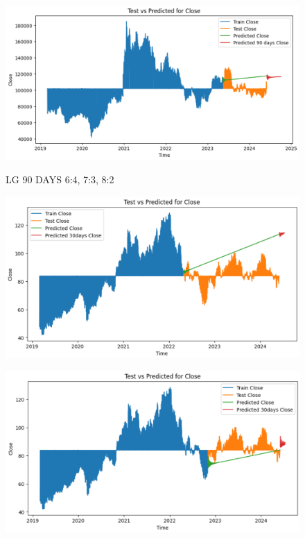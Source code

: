 \documentclass{article}
\begin{document}
\begin{multicols}{2}
\begin{figure}[H]
\begin{minipage}{0.15\textwidth}
    \label{fig:2}
    \end{minipage}%
    \begin{minipage}{0.15\textwidth}
    \centering
    \includegraphics[width=1\textwidth]{Image/VARMA/LG/8_2/90.png}

    \label{fig:3}
    \end{minipage}
    \caption{LG 90 DAYS  6:4, 7:3, 8:2 }
\end{figure}

\begin{figure}[H]
    \centering
    \begin{minipage}{0.15\textwidth}
    \centering
    \includegraphics[width=1\textwidth]{Image/VARMA/SONY/6_4/30.png}
   
    \label{fig:1}
    \end{minipage}%
    \begin{minipage}{0.15\textwidth}
    \centering
    \includegraphics[width=1\textwidth]{Image/VARMA/SONY/7_3/30.png}
  

\end{minipage}
\end{figure}
\end{multicols}
\end{document}
